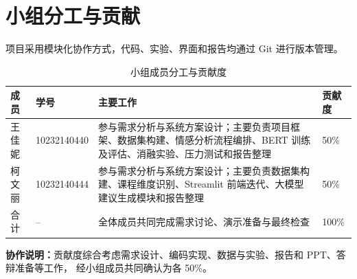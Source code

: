 \section{小组分工与贡献}

项目采用模块化协作方式，代码、实验、界面和报告均通过 Git 进行版本管理。

\begin{table}[H]
  \centering
  \caption{小组成员分工与贡献度}
  \label{tab:contributions}
  \small
  \begin{tabularx}{\textwidth}{C{2.3cm} C{2.7cm} Y C{2cm}}
    \toprule
    成员 & 学号 & 主要工作 & 贡献度 \\
    \midrule
    王佳妮 &
    10232140440 &
    参与需求分析与系统方案设计；主要负责项目框架、数据集构建、情感分析流程编排、BERT 训练及评估、消融实验、压力测试和报告整理 &
    50\% \\
    柯文丽 &
    10232140444 &
    参与需求分析与系统方案设计；主要负责数据集构建、课程维度识别、Streamlit 前端迭代、大模型建议生成模块和报告整理 &
    50\% \\
    \midrule
    合计 & -- & 全体成员共同完成需求讨论、演示准备与最终检查 & 100\% \\
    \bottomrule
  \end{tabularx}
\end{table}

\textbf{协作说明：}贡献度综合考虑需求设计、编码实现、数据与实验、报告和 PPT、答辩准备等工作，
经小组成员共同确认为各 50\%。
